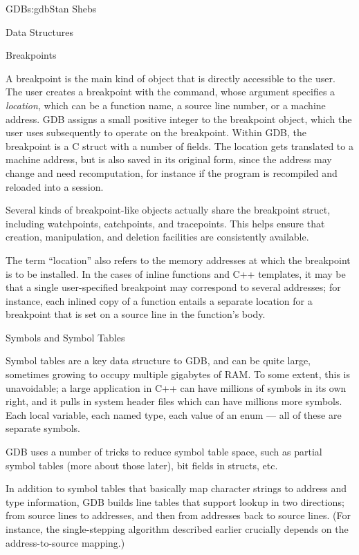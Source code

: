 \begin{aosachapter}{GDB}{s:gdb}{Stan Shebs}
\begin{aosasect1}{Data Structures}
\end{aosasect1}

\begin{aosasect2}{Breakpoints}

A breakpoint is the main kind of object that is directly accessible to
the user.  The user creates a breakpoint with the 
command, whose argument specifies a {\em location}, which can be a
function name, a source line number, or a machine address.  GDB
assigns a small positive integer to the breakpoint object, which the
user uses subsequently to operate on the breakpoint.  Within GDB, the
breakpoint is a C struct with a number of fields.  The location gets
translated to a machine address, but is also saved in its original
form, since the address may change and need recomputation, for
instance if the program is recompiled and reloaded into a session.

Several kinds of breakpoint-like objects actually share the breakpoint
struct, including watchpoints, catchpoints, and tracepoints.  This
helps ensure that creation, manipulation, and deletion facilities are
consistently available.

The term ``location'' also refers to the memory addresses at which the
breakpoint is to be installed.  In the cases of inline functions and
C++ templates, it may be that a single user-specified breakpoint may
correspond to several addresses; for instance, each inlined copy of a
function entails a separate location for a breakpoint that is set on a
source line in the function's body.

\end{aosasect2}

\begin{aosasect2}{Symbols and Symbol Tables}

Symbol tables are a key data structure to GDB, and can be quite large,
sometimes growing to occupy multiple gigabytes of RAM.  To some
extent, this is unavoidable; a large application in C++ can have
millions of symbols in its own right, and it pulls in system header
files which can have millions more symbols.  Each local variable, each
named type, each value of an enum --- all of these are separate symbols.

GDB uses a number of tricks to reduce symbol table space, such as
partial symbol tables (more about those later), bit fields in structs,
etc.

In addition to symbol tables that basically map character strings to
address and type information, GDB builds line tables that support
lookup in two directions; from source lines to addresses, and then
from addresses back to source lines.  (For instance, the
single-stepping algorithm described earlier crucially depends on the
address-to-source mapping.)


\end{aosasect2}
\end{aosachapter}
